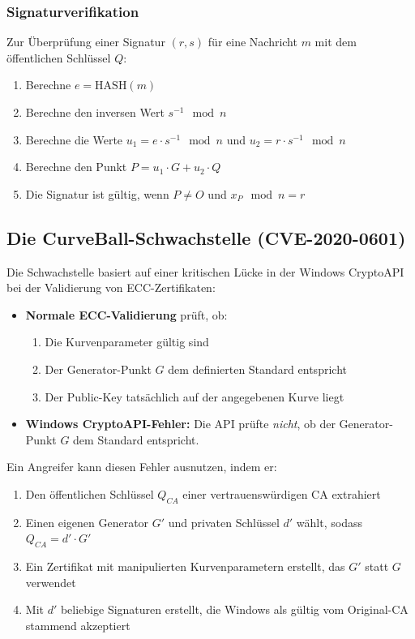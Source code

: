 \documentclass{article}
\begin{document}
\subsubsection{Signaturverifikation}
Zur Überprüfung einer Signatur \((r, s)\) für eine Nachricht \(m\) mit dem öffentlichen Schlüssel \(Q\):
\begin{enumerate}
  \item Berechne \(e = \text{HASH}(m)\)
  \item Berechne den inversen Wert \(s^{-1} \mod n\)
  \item Berechne die Werte \(u_1 = e \cdot s^{-1} \mod n\) und \(u_2 = r \cdot s^{-1} \mod n\)
  \item Berechne den Punkt \(P = u_1 \cdot G + u_2 \cdot Q\)
  \item Die Signatur ist gültig, wenn \(P \neq O\) und \(x_P \mod n = r\)
\end{enumerate}

\subsection{Die CurveBall-Schwachstelle (CVE-2020-0601)}

Die Schwachstelle basiert auf einer kritischen Lücke in der Windows CryptoAPI bei der Validierung von ECC-Zertifikaten:

\begin{itemize}
  \item \textbf{Normale ECC-Validierung} prüft, ob:
  \begin{enumerate}
    \item Die Kurvenparameter gültig sind
    \item Der Generator-Punkt \(G\) dem definierten Standard entspricht
    \item Der Public-Key tatsächlich auf der angegebenen Kurve liegt
  \end{enumerate}
  
  \item \textbf{Windows CryptoAPI-Fehler:} Die API prüfte \textit{nicht}, ob der Generator-Punkt \(G\) dem Standard entspricht.
\end{itemize}

Ein Angreifer kann diesen Fehler ausnutzen, indem er:
\begin{enumerate}
  \item Den öffentlichen Schlüssel \(Q_{CA}\) einer vertrauenswürdigen CA extrahiert
  \item Einen eigenen Generator \(G'\) und privaten Schlüssel \(d'\) wählt, sodass \(Q_{CA} = d' \cdot G'\)
  \item Ein Zertifikat mit manipulierten Kurvenparametern erstellt, das \(G'\) statt \(G\) verwendet
  \item Mit \(d'\) beliebige Signaturen erstellt, die Windows als gültig vom Original-CA stammend akzeptiert
\end{enumerate}
\end{document}
